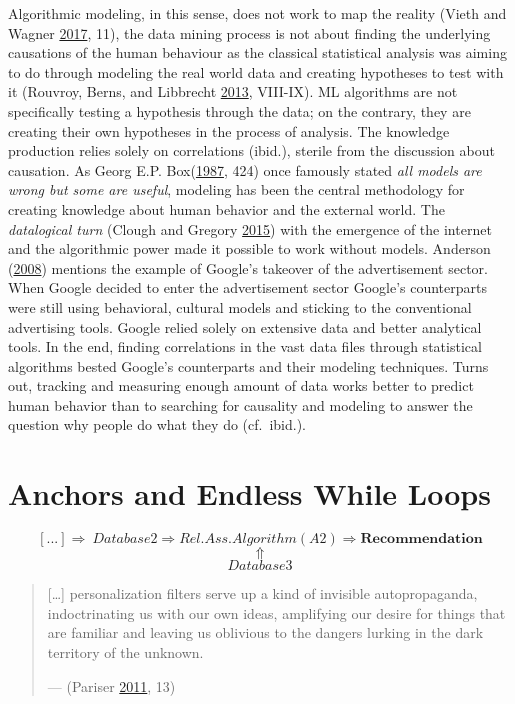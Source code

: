 \documentclass[12pt,twoside]{report}
\begin{document}
Algorithmic modeling, in this sense, does not work to map the reality (Vieth and Wagner \protect\hyperlink{ref-Vieth2017}{2017}, 11), the data mining process is not about finding the underlying causations of the human behaviour as the classical statistical analysis was aiming to do through modeling the real world data and creating hypotheses to test with it (Rouvroy, Berns, and Libbrecht \protect\hyperlink{ref-Rouvroy2013}{2013}, VIII-IX). ML algorithms are not specifically testing a hypothesis through the data; on the contrary, they are creating their own hypotheses in the process of analysis. The knowledge production relies solely on correlations (ibid.), sterile from the discussion about causation. As Georg E.P. Box(\protect\hyperlink{ref-Box1987}{1987}, 424) once famously stated \emph{all models are wrong but some are useful}, modeling has been the central methodology for creating knowledge about human behavior and the external world. The \emph{datalogical turn} (Clough and Gregory \protect\hyperlink{ref-Clough2015}{2015}) with the emergence of the internet and the algorithmic power made it possible to work without models. Anderson (\protect\hyperlink{ref-Anderson2008}{2008}) mentions the example of Google's takeover of the advertisement sector. When Google decided to enter the advertisement sector Google's counterparts were still using behavioral, cultural models and sticking to the conventional advertising tools. Google relied solely on extensive data and better analytical tools. In the end, finding correlations in the vast data files through statistical algorithms bested Google's counterparts and their modeling techniques. Turns out, tracking and measuring enough amount of data works better to predict human behavior than to searching for causality and modeling to answer the question why people do what they do (cf.~ibid.).

\newpage

\hypertarget{anchors-and-endless-while-loops}{%
\section{Anchors and Endless While Loops}\label{anchors-and-endless-while-loops}}

\[ [...]\Rightarrow \ Database 2 \Rightarrow Rel. Ass. Algorithm (A2) \Rightarrow \textbf{Recommendation}\]
\[    \Uparrow \]
\[  Database 3 \]

\begin{quote}
{[}\ldots{}{]} personalization filters serve up a kind of invisible autopropaganda, indoctrinating us with our own ideas, amplifying our desire for things that are familiar and leaving us oblivious to the dangers lurking in the dark territory of the unknown.

--- (Pariser \protect\hyperlink{ref-Pariser2011}{2011}, 13)
\end{quote}
\end{document}

